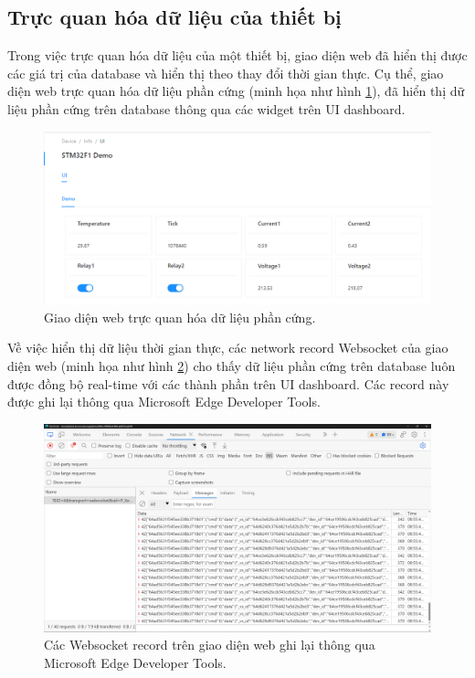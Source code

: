 \subsection{Trực quan hóa dữ liệu của thiết bị}

Trong việc trực quan hóa dữ liệu của một thiết bị, giao diện web đã hiển thị được các giá trị của database và hiển thị theo thay đổi thời gian thực. Cụ thể, giao diện web trực quan hóa dữ liệu phần cứng (minh họa như hình \ref{fig:web-interface-for-physic}), đã hiển thị dữ liệu phần cứng trên database thông qua các widget trên UI dashboard.

\begin{figure}[htp]
\centering
\captionsetup{justification=centering,margin=2cm}
\includegraphics[width=1.0\linewidth, frame]{images/fig-web-interface-for-physic.png}
\caption{Giao diện web trực quan hóa dữ liệu phần cứng.}
\label{fig:web-interface-for-physic}
\end{figure}

Về việc hiển thị dữ liệu thời gian thực, các network record Websocket của giao diện web (minh họa như hình \ref{fig:websocket-records}) cho thấy dữ liệu phần cứng trên database luôn được đồng bộ real-time với các thành phần trên UI dashboard. Các record này được ghi lại thông qua Microsoft Edge Developer Tools.

\begin{figure}[htp]
\centering
\captionsetup{justification=centering,margin=2cm}
\includegraphics[width=1.0\linewidth, frame]{images/fig-websocket-records.png}
\caption{Các Websocket record trên giao diện web ghi lại thông qua Microsoft Edge Developer Tools.}
\label{fig:websocket-records}
\end{figure}


